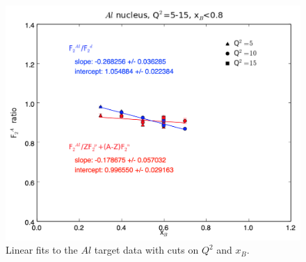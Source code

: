 \documentclass[oneside]{article}
\begin{document}
\begin{figure}[H]
\begin{minipage}{0.5\textwidth}
\includegraphics[width=\textwidth]{plots/q2_all_x_all/all_Al.png}
\end{minipage}
  \caption[]{Linear fits to the $Al$ target data with cuts on $Q^2$ and $x_B$.}
  \label{fig:fits_Al}
\end{figure}   
\end{document}
